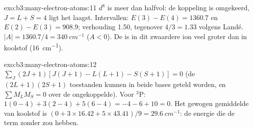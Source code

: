 \begin{solution}{exo:b3:many-electron-atoms:11}
$d^8$ is meer dan halfvol: de koppeling is omgekeerd, $J = L + S = 4$
ligt het laagst. Intervallen: $E(3) - E(4) = 1360.7$ en $E(2) - E(3) = 908.9$;
verhouding 1.50, tegenover $4/3 = 1.33$ volgens Landé. $|A| = 1360.7/4 = \qty{340}{cm^{-1}}$
($A < 0$). De  is in dit zwaardere ion veel groter dan in
koolstof (\qty{16}{cm^{-1}}).
\end{solution}

\begin{solution}{exo:b3:many-electron-atoms:12}
$\sum_J(2J+1)[J(J+1) - L(L+1) - S(S+1)] = 0$ (de $(2L+1)(2S+1)$ toestanden
kunnen in beide bases geteld worden, en $\sum M_LM_S = 0$ over de
ongekoppelde). Voor ${}^3$P: $1(0 - 4) + 3(2 - 4) + 5(6 - 4) = -4 - 6 + 10 = 0$.
Het gewogen gemiddelde van koolstof is $(0 + 3 \times 16.42 + 5 \times 43.41)/9 = \qty{29.6}{cm^{-1}}$:
de energie die de term zonder  zou hebben.
\end{solution}

